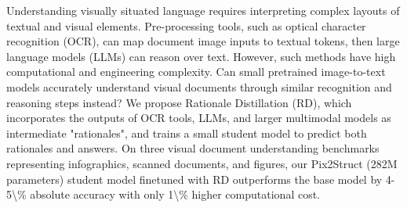 Understanding visually situated language requires interpreting complex layouts of textual and visual elements.  Pre-processing tools, such as optical character recognition (OCR), can map document image inputs to textual tokens, then large language models (LLMs) can reason over text. However, such methods have high computational and engineering complexity.  Can small pretrained image-to-text models accurately understand visual documents through similar recognition and reasoning steps instead? We propose Rationale Distillation (RD), which incorporates the outputs of OCR tools, LLMs, and larger multimodal models as intermediate "rationales", and trains a small student model to predict both rationales and answers.  On three visual document understanding benchmarks representing infographics, scanned documents, and figures, our Pix2Struct (282M parameters) student model finetuned with RD outperforms the base model by 4-5\textbackslash{}\% absolute accuracy with only 1\textbackslash{}\% higher computational cost.